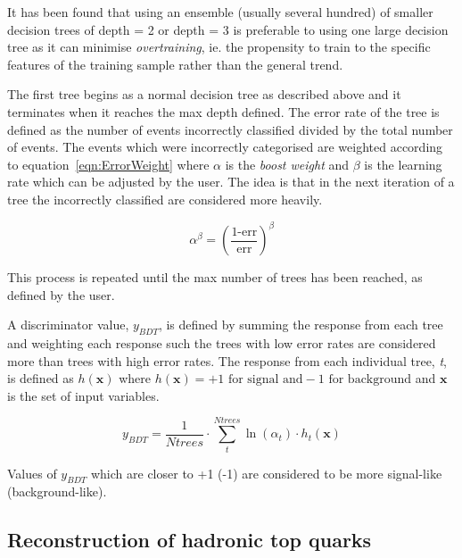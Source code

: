 It has been found that using an ensemble (usually several hundred) of smaller decision trees of depth = 2 or depth = 3 is preferable to using one large decision tree as it can minimise \emph{overtraining}, ie. the propensity to train to the specific features of the training sample rather than the general trend. 

The first tree begins as a normal decision tree as described above and it terminates when it reaches the max depth defined. The error rate of the tree is defined as the number of events incorrectly classified divided by the total number of events. The events which were incorrectly categorised are weighted according to equation~\ref{eqn:ErrorWeight} where $\alpha$ is the \emph{boost weight} and $\beta$ is the learning rate which can be adjusted by the user. The idea is that in the next iteration of a tree the incorrectly classified are considered more heavily. 

\begin{equation}
\alpha^{\beta} = \left( \frac{\textrm{1-err}}{\textrm{err}}  \right)^{\beta}
\label{eqn:ErrorWeight}
\end{equation}

This process is repeated until the max number of trees has been reached, as defined by the user. 

A discriminator value, $y_{BDT}$, is defined by summing the response from each tree and weighting each response such the trees with low error rates are considered more than trees with high error rates. The response from each individual tree, \emph{t}, is defined as $h\left(\textbf{x}\right)$ where $h\left(\textbf{x}\right) = +1 \textrm{ for signal and} -1 \textrm{ for background}$ and $\textbf{x}$ is the set of input variables. 

\begin{equation}
y_{BDT} = \frac{1}{Ntrees} \cdot \sum_{t}^{Ntrees} \ln \left(\alpha_{t}\right) \cdot h_{t}\left(\textbf{x}\right)
\end{equation}

Values of $y_{BDT}$ which are closer to +1 (-1) are considered to be more signal-like (background-like).

\subsection{Reconstruction of hadronic top quarks}

